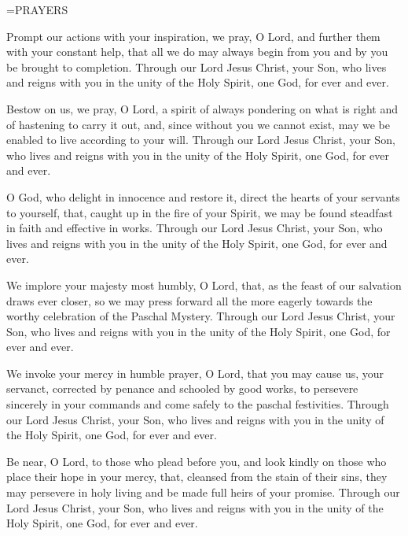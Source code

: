 \hangindent=\parindent \small PRAYERS
\begin{description}[labelindent=\parindent, noitemsep, leftmargin=*]
\item [Thursday after Ash Wednesday:] 	Prompt our actions with your inspiration, we pray, O Lord, and further them with your constant help, that all we do may always begin from you and by you be brought to completion. Through our Lord Jesus Christ, your Son, who lives and reigns with you in the unity of the Holy Spirit, one God, for ever and ever.
\item [Week 1:] 	Bestow on us, we pray, O Lord, a spirit of always pondering on what is right and of hastening to carry it out, and, since without you we cannot exist, may we be enabled to live according to your will. Through our Lord Jesus Christ, your Son, who lives and reigns with you in the unity of the Holy Spirit, one God, for ever and ever.
\item [Week 2:] 	O God, who delight in innocence and restore it, direct the hearts of your servants to yourself, that, caught up in the fire of your Spirit, we may be found steadfast in faith and effective in works. Through our Lord Jesus Christ, your Son, who lives and reigns with you in the unity of the Holy Spirit, one God, for ever and ever.
\item [Week 3:] 	We implore your majesty most humbly, O Lord, that, as the feast of our salvation draws ever closer, so we may press forward all the more eagerly towards the worthy celebration of the Paschal Mystery. Through our Lord Jesus Christ, your Son, who lives and reigns with you in the unity of the Holy Spirit, one God, for ever and ever.
\item [Week 4:] 	We invoke your mercy in humble prayer, O Lord, that you may cause us, your servanct, corrected by penance and schooled by good works, to persevere sincerely in your commands and come safely to the paschal festivities. Through our Lord Jesus Christ, your Son, who lives and reigns with you in the unity of the Holy Spirit, one God, for ever and ever.
\item [Week 5:] 	Be near, O Lord, to those who plead before you, and look kindly on those who place their hope in your mercy, that, cleansed from the stain of their sins, they may persevere in holy living and be made full heirs of your promise. Through our Lord Jesus Christ, your Son, who lives and reigns with you in the unity of the Holy Spirit, one God, for ever and ever.
\end{description}

